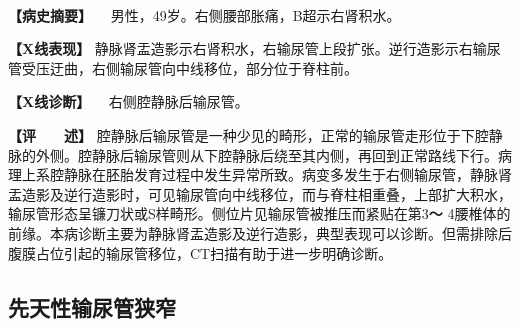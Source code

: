\begin{figure}
    \centering
    \\
    \caption{}
    \label{fig6-2-10}
\end{figure}

\textbf{【病史摘要】} 　男性，49岁。右侧腰部胀痛，B超示右肾积水。

\textbf{【X线表现】}
静脉肾盂造影示右肾积水，右输尿管上段扩张。逆行造影示右输尿管受压迂曲，右侧输尿管向中线移位，部分位于脊柱前。

\textbf{【X线诊断】} 　右侧腔静脉后输尿管。

\textbf{【评　　述】}
腔静脉后输尿管是一种少见的畸形，正常的输尿管走形位于下腔静脉的外侧。腔静脉后输尿管则从下腔静脉后绕至其内侧，再回到正常路线下行。病理上系腔静脉在胚胎发育过程中发生异常所致。病变多发生于右侧输尿管，静脉肾盂造影及逆行造影时，可见输尿管向中线移位，而与脊柱相重叠，上部扩大积水，输尿管形态呈镰刀状或S样畸形。侧位片见输尿管被推压而紧贴在第3\textbf{～}
4腰椎体的前缘。本病诊断主要为静脉肾盂造影及逆行造影，典型表现可以诊断。但需排除后腹膜占位引起的输尿管移位，CT扫描有助于进一步明确诊断。

\subsection{先天性输尿管狭窄}

\begin{figure}
    \centering
    \\
    \\
    \caption{}
    \label{fig6-2-11}
\end{figure}


